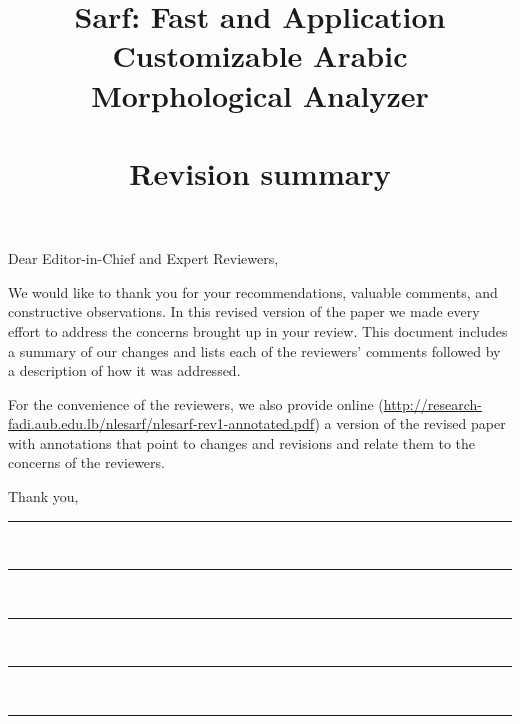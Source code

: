 \documentclass[11pt]{article}
\title{Sarf: Fast and Application Customizable Arabic Morphological Analyzer
 \\
~~ \\
  Revision summary }
\date{}
\begin{document}
\maketitle

{\noindent Dear Editor-in-Chief and Expert Reviewers,}

We would like to thank you for your recommendations, valuable comments, 
and constructive observations. 
In this revised version of the paper we made every effort to address the 
concerns brought up in your review. 
This document includes a summary of our changes and lists each of the 
reviewers’ comments followed by a description of how it was addressed. 

For the convenience of the reviewers, we also provide online 
(\url{http://research-fadi.aub.edu.lb/nlesarf/nlesarf-rev1-annotated.pdf})  
a version of the revised paper with annotations that point to changes and 
revisions and relate them to the concerns of the reviewers. 

Thank you,
\newline
\hrule



~\newline
\hrule


~\newline
\hrule


~\newline
\hrule


~\newline
\hrule

%
\end{document}
